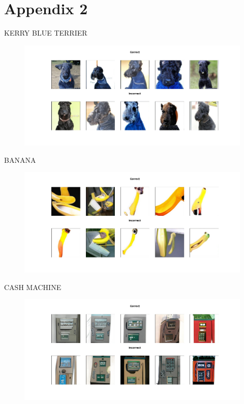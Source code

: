 \documentclass[12pt,a4paper,openany]{book}
\begin{document}
\chapter{Appendix 2}
\noindent KERRY BLUE TERRIER
\begin{figure}[h!]
    \centering
    \includegraphics[scale=0.4]{figs/imagenet_examples/Kerry blue terrier.png}
\end{figure}
\newline
BANANA
\begin{figure}[h!]
    \centering
    \includegraphics[scale=0.4]{figs/imagenet_examples/banana.png}
\end{figure}
\newpage
\noindent CASH MACHINE
\begin{figure}[h!]
    \centering
    \includegraphics[scale=0.4]{figs/imagenet_examples/cash machine.png}
\end{figure}
\end{document}
